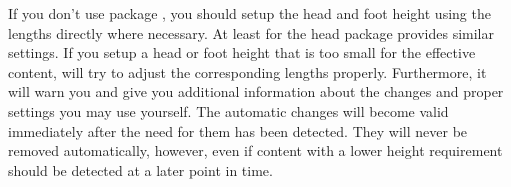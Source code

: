 If you don't use package , you should setup the head and
foot height using the lengths directly where necessary. At least for the head
package  provides similar settings. If you setup a head or
foot height that is too small for the effective content,
 will try to adjust the corresponding lengths
properly. Furthermore, it will warn you and give you additional information
about the changes and proper settings you may use yourself. The automatic
changes will become valid immediately after the need for them has been
detected.  They will never be removed automatically, however, even if content
with a lower height requirement should be detected at a later point in time.%
%
%

\fi %

